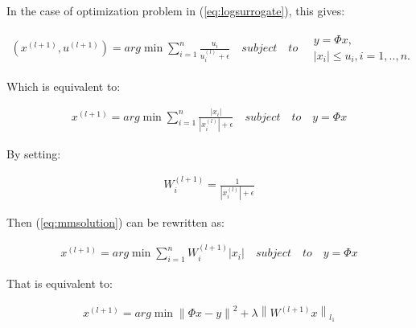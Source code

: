In the case of optimization problem in (\ref{eq:logsurrogate}), this gives:

\begin{equation}
\begin{gathered}
\left ( x^{\left ( l+1 \right )}, u^{\left ( l+1 \right )} \right ) =
arg \min \sum_{i=1}^{n}\frac{u_{i}}{u_{i}^{\left ( l \right )}+\epsilon }
\quad subject \quad to \quad \begin{matrix}
y=\Phi x,\\
\left | x_{i} \right | \leq u_{i}, i=1,..,n. 
\end{matrix}
\end{gathered}
\end{equation}

Which is equivalent to:

\begin{equation}
\label{eq:mmsolution}
\begin{gathered}
 x^{\left ( l+1 \right )} = arg \min \sum_{i=1}^{n} \frac{\left | x_{i} \right |}{\left | x_{i}^{\left ( l \right )} \right |+\epsilon }
\quad subject \quad to \quad y=\Phi x
\end{gathered}
\end{equation}

By setting:

\begin{equation}
\begin{gathered}
W_{i}^{\left ( l+1 \right )}  = \frac{1}{\left | x_{i}^{\left ( l \right )} \right |+\epsilon }
\end{gathered}
\end{equation}

Then (\ref{eq:mmsolution}) can be rewritten as:

\begin{equation}
\begin{gathered}
x^{\left ( l+1 \right )} = arg \min \sum_{i=1}^{n} W_{i}^{\left ( l+1 \right )} \left | x_{i} \right |
\quad subject \quad to \quad y=\Phi x
\end{gathered}
\end{equation}

That is equivalent to:

\begin{equation}
\begin{gathered}
x^{\left ( l+1 \right )} = arg \min \left \| \Phi x-y \right \|^{2} + \lambda \left \| W^{\left ( l+1 \right )} x \right \|_{l_{1}}
\end{gathered}
\end{equation}

